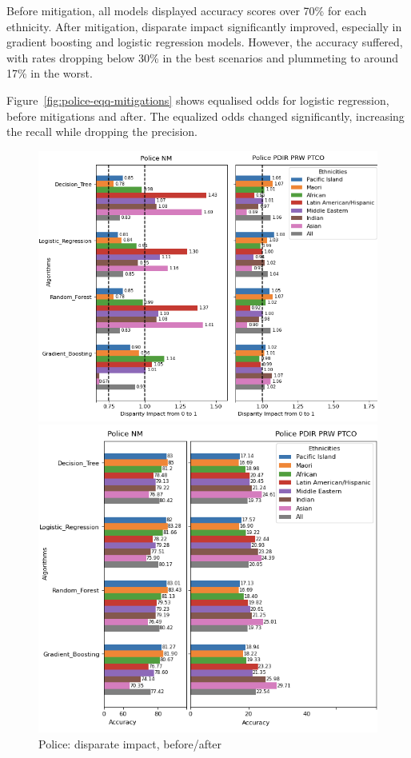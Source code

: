 \documentclass[runningheads]{llncs}
\begin{document}
Before mitigation, all models displayed accuracy scores over 70\% for
each ethnicity.
After mitigation, disparate impact significantly improved, especially
in gradient boosting and logistic regression models.
However, the accuracy suffered, with rates dropping below 30\% in the
best scenarios and plummeting to around 17\% in the worst.

Figure~\ref{fig:police-eqq-mitigations} shows equalised odds for
logistic regression, before mitigations and after.
The equalized odds changed significantly, increasing the recall while
dropping the precision.

\begin{figure}
    \begin{minipage}{0.52\textwidth}
        \includegraphics[width=\textwidth]{../tex/police_di_1_2}
        \caption{Police: disparate impact, before/after}
        \label{fig:police-di-mitigation}
    \end{minipage}
    \begin{minipage}{0.47\textwidth}
        \includegraphics[width=\textwidth]{../tex/police_acc_1_2}

\end{minipage}
\end{figure}
\end{document}
